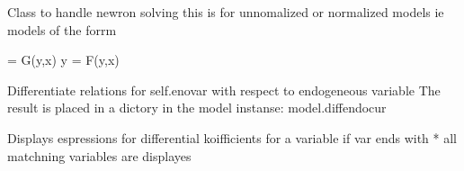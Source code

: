 \documentclass[letterpaper,10pt,english]{sphinxmanual}
\begin{document}
\begin{fulllineitems}
\label{\detokenize{index:modelnewton.newton_diff}}
\pysigstartsignatures
{}
\pysigstopsignatures
\sphinxAtStartPar
Class to handle newron solving
this is for un\sphinxhyphen{}nomalized or normalized models ie models of the forrm

 = G(y,x)
y = F(y,x)

\begin{fulllineitems}
\label{\detokenize{index:modelnewton.newton_diff.modeldiff}}
\pysigstartsignatures
{}
\pysigstopsignatures
\sphinxAtStartPar
Differentiate relations for self.enovar with respect to endogeneous variable
The result is placed in a dictory in the model instanse: model.diffendocur

\end{fulllineitems}


\begin{fulllineitems}
\label{\detokenize{index:modelnewton.newton_diff.show_diff}}
\pysigstartsignatures
{}
\pysigstopsignatures
\sphinxAtStartPar
Displays espressions for differential koifficients for a variable
if var ends with * all matchning variables are displayes


\end{fulllineitems}
\end{fulllineitems}
\end{document}

